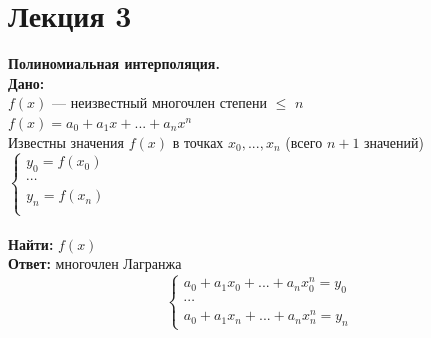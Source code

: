 \documentclass[12pt]{article}
\theoremstyle{definition}
\numberwithin{equation}{section}
\begin{document}
\section *{Лекция 3}
\noindent \textbf{Полиномиальная интерполяция.}\\
\textbf{Дано:} \\$f(x)$ --- неизвестный многочлен степени $\leq$ $n$\\
$f(x) = a_{0}+a_1x+...+a_nx^n$ \\
Известны значения $f(x)$ в точках $x_0, ..., x_n$ (всего $n+1$ значений)\\ 
$
\left\{  
\begin{array}{ccl}  
    y_0=f(x_0)\\
   \cdots\\
   y_n=f(x_n)\\  
\end{array}   
\right.  
$
\\
\\ \textbf{Найти:} $f(x)$
\\ \textbf{Ответ:} многочлен Лагранжа \\
\begin{equation*}
 \begin{cases}
   a_0+a_1x_0+...+a_nx_0^n = y_0\\
   \cdots\\
   a_0+a_1x_n+...+a_nx_n^n = y_n
 \end{cases}
\end{equation*}
\end{document}
